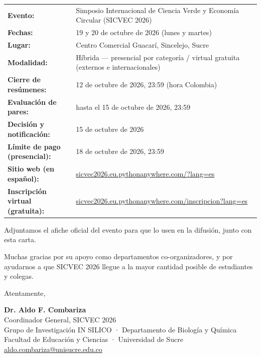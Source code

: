 \documentclass[11pt,a4paper]{article}
\begin{document}
\begin{tabularx}{\linewidth}{@{}l X@{}}
\textbf{Evento:} & Simposio Internacional de Ciencia Verde y Economía Circular (SICVEC 2026) \\
\textbf{Fechas:} & 19 y 20 de octubre de 2026 (lunes y martes) \\
\textbf{Lugar:} & Centro Comercial Guacarí, Sincelejo, Sucre \\
\textbf{Modalidad:} & Híbrida — presencial por categoría / virtual gratuita (externos e internacionales) \\
\textbf{Cierre de resúmenes:} & 12 de octubre de 2026, 23:59 (hora Colombia) \\
\textbf{Evaluación de pares:} & hasta el 15 de octubre de 2026, 23:59 \\
\textbf{Decisión y notificación:} & 15 de octubre de 2026 \\
\textbf{Límite de pago (presencial):} & 18 de octubre de 2026, 23:59 \\
\textbf{Sitio web (en español):} & \href{https://sicvec2026.eu.pythonanywhere.com/?lang=es}{sicvec2026.eu.pythonanywhere.com/?lang=es} \\
\textbf{Inscripción virtual (gratuita):} & \href{https://sicvec2026.eu.pythonanywhere.com/inscripcion?lang=es}{sicvec2026.eu.pythonanywhere.com/inscripcion?lang=es} \\
\end{tabularx}

\vspace{0.1cm}

Adjuntamos el afiche oficial del evento para que lo usen en la difusión, junto con esta carta.

\vspace{0.1cm}

Muchas gracias por su apoyo como departamentos co-organizadores, y por ayudarnos a que SICVEC 2026 llegue a la mayor cantidad posible de estudiantes y colegas.

\vspace{0.15cm}

Atentamente,

\vspace{0.15cm}

\textbf{Dr. Aldo F. Combariza}\\
Coordinador General, SICVEC 2026\\
Grupo de Investigación IN SILICO · Departamento de Biología y Química\\
Facultad de Educación y Ciencias · Universidad de Sucre\\
\href{mailto:aldo.combariza@unisucre.edu.co}{aldo.combariza@unisucre.edu.co}
\end{document}
